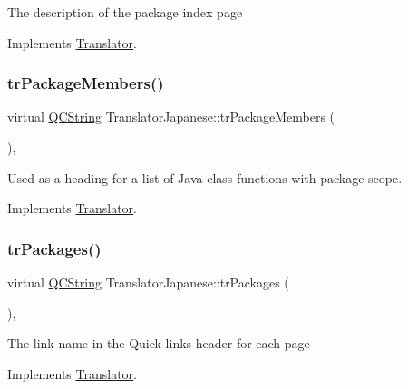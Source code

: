 The description of the package index page 

Implements \mbox{\hyperlink{class_translator}{Translator}}.

\mbox{\label{class_translator_japanese_a16b15f694d21b68f06d73b613e01a0fa}} 
\subsubsection{\texorpdfstring{trPackageMembers()}{trPackageMembers()}}
{\footnotesize\ttfamily virtual \mbox{\hyperlink{class_q_c_string}{Q\+C\+String}} Translator\+Japanese\+::tr\+Package\+Members (\begin{DoxyParamCaption}{ }\end{DoxyParamCaption})\hspace{0.3cm}{\ttfamily [inline]}, {\ttfamily [virtual]}}

Used as a heading for a list of Java class functions with package scope. 

Implements \mbox{\hyperlink{class_translator}{Translator}}.

\mbox{\label{class_translator_japanese_a4c78ec3aba82e4e5c12bab8f6da15311}} 
\subsubsection{\texorpdfstring{trPackages()}{trPackages()}}
{\footnotesize\ttfamily virtual \mbox{\hyperlink{class_q_c_string}{Q\+C\+String}} Translator\+Japanese\+::tr\+Packages (\begin{DoxyParamCaption}{ }\end{DoxyParamCaption})\hspace{0.3cm}{\ttfamily [inline]}, {\ttfamily [virtual]}}

The link name in the Quick links header for each page 

Implements \mbox{\hyperlink{class_translator}{Translator}}.

\mbox{\label{class_translator_japanese_a3a0ca96e9bd66dfd07c036fd83b4ce1a}} 
